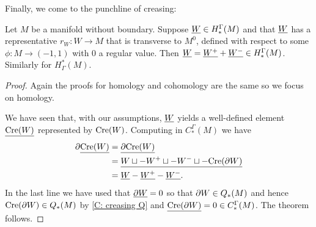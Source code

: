 Finally, we come to the punchline of creasing:

\begin{theorem}\label{T: cohomology creasing}
Let $M$ be a manifold without boundary. Suppose $\underline{W}\in H_*^\Gamma(M)$ and that $\underline{W}$ has a representative $r_W:W\to M$ that is transverse to $M^0$, defined with respect to some  $\phi:M\to (-1,1)$ with $0$ a regular value.
Then $\underline{W}=\underline{W^+}+\underline{W^-}\in H_*^\Gamma(M)$. Similarly for $H^*_\Gamma(M)$.
\end{theorem}
\begin{proof}
Again the proofs for homology and cohomology are the same so we focus on homology.

We have seen that, with our assumptions, $\underline{W}$ yields a well-defined element $\underline{\mathrm{Cre}(W)}$ represented by $\mathrm{Cre}(W)$. Computing in $C_*^\Gamma(M)$ we have
\begin{align*}
\partial \underline{\mathrm{Cre}(W)}&=\underline{\partial \mathrm{Cre}(W) }\\
&=\underline{W\sqcup -W^+\sqcup -W^-\sqcup -\mathrm{Cre}(\partial W)}\\
&=\underline{W} -\underline{W^+}-\underline{W^-}.
\end{align*}
In the last line we have used that $\underline{\partial W}=0$ so that $\partial W\in Q_*(M)$ and hence $\mathrm{Cre}(\partial W)\in Q_*(M)$ by \cref{C: creasing Q} and  $\underline{\mathrm{Cre}(\partial W)}=0\in C_*^\Gamma(M)$.
The theorem follows.
\end{proof}

